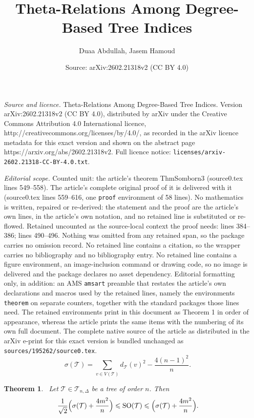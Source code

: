 \documentclass[10pt,a4paper]{amsart}
\title{Theta-Relations Among Degree-Based Tree Indices}
\author{Duaa Abdullah, Jasem Hamoud}
\date{Source: arXiv:2602.21318v2 (CC BY 4.0)}
\newtheorem{theorem}{Theorem}
\newcommand{\SO}{\mathrm{SO}}
\newcommand{\TT}{\mathcal{T}}
\begin{document}
\maketitle

\noindent\emph{Source and licence.} Theta-Relations Among Degree-Based Tree Indices. Version arXiv:2602.21318v2 (CC BY 4.0), distributed by arXiv under the Creative Commons Attribution 4.0 International licence, http://creativecommons.org/licenses/by/4.0/, as recorded in the arXiv licence metadata for this exact version and shown on the abstract page https://arxiv.org/abs/2602.21318v2. Full licence notice: \texttt{licenses/arxiv-2602.21318-CC-BY-4.0.txt}.\par\smallskip

\noindent\textit{Editorial scope.} Counted unit: the article's theorem ThmSomborn3 (source0.tex lines 549--558). The article's complete original proof of it is delivered with it (source0.tex lines 559--616, one \texttt{proof} environment of 58 lines). No mathematics is written, repaired or re-derived: the statement and the proof are the article's own lines, in the article's own notation, and no retained line is substituted or re-flowed.  Retained uncounted as the source-local context the proof needs: lines 384--386; lines 490--496.  Nothing was omitted from any retained span, so the package carries no omission record.  No retained line contains a citation, so the wrapper carries no bibliography and no bibliography entry.  No retained line contains a figure environment, an image-inclusion command or drawing code, so no image is delivered and the package declares no asset dependency.  Editorial formatting only, in addition: an AMS \texttt{amsart} preamble that restates the article's own declarations and macros used by the retained lines, namely the environments \texttt{theorem} on separate counters, together with the standard packages those lines need.  The retained environments print in this document as Theorem 1 in order of appearance, whereas the article prints the same items with the numbering of its own full document.  The complete native source of the article as distributed in the arXiv e-print for this exact version is bundled unchanged as \texttt{sources/195262/source0.tex}.
\begin{equation}~\label{eqqq4lemSomborIn2}
\sigma(\TT)=\sum_{v\in V(\TT)}d_\TT(v)^2-\frac{4(n-1)^2}{n}.
\end{equation}

\begin{theorem}~\label{ThmSomborn2}
Let $\TT\in \mathcal{T}_{n,\Delta}$ be a tree of order $n$.
Then
\begin{equation}~\label{eqq1ThmSomborn2}
\frac{1}{\sqrt{2}}\Bigl(\sigma(\TT)+\frac{4m^2}{n}\Bigr) \leqslant \SO(\TT)\leqslant\Bigl(\sigma(\TT)+\frac{4m^2}{n}\Bigr).
\end{equation}
\end{theorem}
\end{document}

